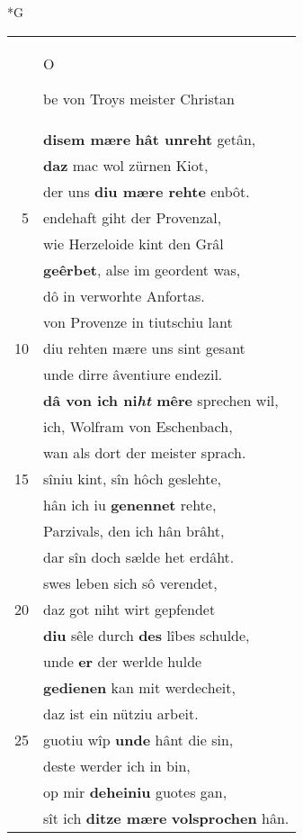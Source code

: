 \documentclass[8pt,a4paper,notitlepage]{article}
\begin{document}
\begin{table}[ht]
\begin{minipage}[t]{0.5\linewidth}
\small
\begin{center}*G
\end{center}
\begin{tabular}{rl}
 & \begin{large}O\end{large}be von Troys meister Christan\\ 
 & \textbf{disem mære} \textbf{hât unreht} getân,\\ 
 & \textbf{daz} mac wol zürnen Kiot,\\ 
 & der uns \textbf{diu mære rehte} enbôt.\\ 
5 & endehaft giht der Provenzal,\\ 
 & wie Herzeloide kint den Grâl\\ 
 & \textbf{geêrbet}, alse im geordent was,\\ 
 & dô in verworhte Anfortas.\\ 
 & von Provenze in tiutschiu lant\\ 
10 & diu rehten mære uns sint gesant\\ 
 & unde dirre âventiure endezil.\\ 
 & \textbf{dâ von ich ni\textit{ht} mêre} sprechen wil,\\ 
 & ich, Wolfram von Eschenbach,\\ 
 & wan als dort der meister sprach.\\ 
15 & sîniu kint, sîn hôch geslehte,\\ 
 & hân ich iu \textbf{genennet} rehte,\\ 
 & Parzivals, den ich hân brâht,\\ 
 & dar sîn doch sælde het erdâht.\\ 
 & swes leben sich sô verendet,\\ 
20 & daz got niht wirt gepfendet\\ 
 & \textbf{diu} sêle durch \textbf{des} lîbes schulde,\\ 
 & unde \textbf{er} der werlde hulde\\ 
 & \textbf{gedienen} kan mit werdecheit,\\ 
 & daz ist ein nütziu arbeit.\\ 
25 & guotiu wîp \textbf{unde} hânt die sin,\\ 
 & deste werder ich in bin,\\ 
 & op mir \textbf{deheiniu} guotes gan,\\ 
 & sît ich \textbf{ditze mære} \textbf{volsprochen} hân.\\ 

\end{tabular}
\end{minipage}
\end{table}
\end{document}
